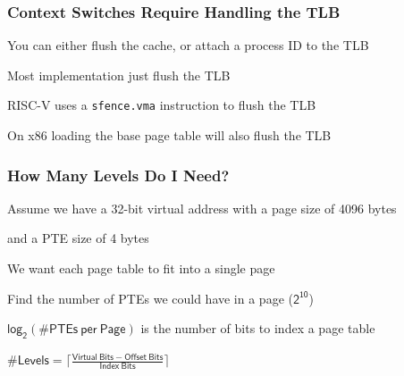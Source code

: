   \begin{frame}
    \frametitle{Context Switches Require Handling the TLB}

    You can either flush the cache, or attach a process ID to the TLB

    \vspace{2em}

    Most implementation just flush the TLB

    \hspace{2em} RISC-V uses a \texttt{sfence.vma} instruction to flush the TLB

    \vspace{2em}

    On x86 loading the base page table will also flush the TLB

  \end{frame}

  \begin{frame}
    \frametitle{How Many Levels Do I Need?}

    Assume we have a 32-bit virtual address with a page size of 4096 bytes

    \hspace{2em} and a PTE size of 4 bytes

    \vspace{2em}

    We want each page table to fit into a single page

    \hspace{2em} Find the number of PTEs we could have in a page ($\mathsf{2^{10}}$)

    \hspace{4em} $\mathsf{log_2(\# PTEs\ per\ Page)}$ is the number of bits to index a page table

    \vspace{2em}

    $\mathsf{\# Levels = \lceil \frac{Virtual\ Bits - Offset\ Bits}{Index\ Bits} \rceil}$

    \vspace{2em}

  \end{frame}

